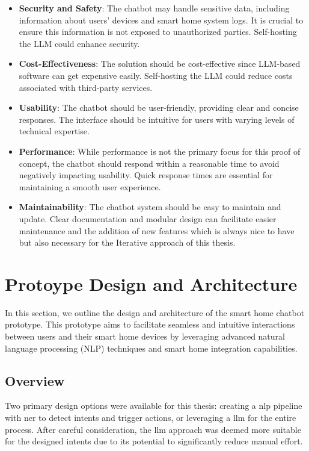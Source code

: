 \begin{itemize}
    \item \textbf{Security and Safety}: The chatbot may handle sensitive data, including information about users' devices and smart home system logs. It is crucial to ensure this information is not exposed to unauthorized parties. Self-hosting the LLM could enhance security.
    
    \item \textbf{Cost-Effectiveness}: The solution should be cost-effective since LLM-based software can get expensive easily. Self-hosting the LLM could reduce costs associated with third-party services.
    
    \item \textbf{Usability}: The chatbot should be user-friendly, providing clear and concise responses. The interface should be intuitive for users with varying levels of technical expertise. 
    
    \item \textbf{Performance}: While performance is not the primary focus for this proof of concept, the chatbot should respond within a reasonable time to avoid negatively impacting usability. Quick response times are essential for maintaining a smooth user experience.
        
    \item \textbf{Maintainability}: The chatbot system should be easy to maintain and update. Clear documentation and modular design can facilitate easier maintenance and the addition of new features which is always nice to have but also necessary for the Iterative approach of this thesis.
\end{itemize}

\section{Protoype Design and Architecture}
\label{sec:design}
In this section, we outline the design and architecture of the smart home chatbot prototype. This prototype aims to facilitate seamless and intuitive interactions between users and their smart home devices by leveraging advanced natural language processing (NLP) techniques and smart home integration capabilities.

\subsection{Overview}
Two primary design options were available for this thesis: creating a \gls{nlp} pipeline with \gls{ner} to detect intents and trigger actions, or leveraging a \gls{llm} for the entire process. After careful consideration, the \gls{llm} approach was deemed more suitable for the designed intents due to its potential to significantly reduce manual effort.


